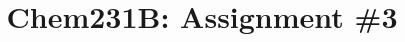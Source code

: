 \documentclass{article}
\title{Chem231B: Assignment \#3} %
\begin{document}
\maketitle

\section*{}
\end{document}

